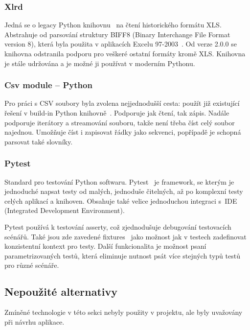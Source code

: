 \subsubsection{Xlrd}
\label{xlrd}

Jedná se o legacy Python knihovnu~\cite{xlrdDocs} na čtení historického formátu XLS. Abstrahuje od parsování struktury BIFF8 (Binary Interchange File Format version 8), která byla použita v aplikacích Excelu 97-2003~\cite{xlsFormat}. Od verze 2.0.0 se knihovna odstranila podporu pro veškeré ostatní formáty kromě XLS. Knihovna je stále udržována a je možné ji používat v moderním Pythonu.~\cite{xlrdChanges} 

\subsubsection{Csv module – Python}

Pro práci s CSV soubory byla zvolena nejjednodušší cesta: použít již existující řešení v build-in Python knihovně~\cite{CsvDocs}. Podporuje jak čtení, tak zápis. Nadále podporuje iterátory a streamování souboru, takže není třeba číst celý soubor najednou. Umožňuje číst i zapisovat řádky jako sekvenci, popřípadě je schopná parsovat také slovníky.

\subsubsection{Pytest}
\label{Pytest}

Standard pro testování Python softwaru. Pytest~\cite{Pytest} je framework, se kterým je jednoduché napsat testy od malých, jednoduše čitelných, až po komplexní testy celých aplikací a knihoven. Obsahuje také velice jednoduchou integraci s~IDE (Integrated Development Environment).

Pytest používá k testování asserty, což zjednodušuje debugování testovacích scénářů. Také jsou zde zavedené fixtures~\cite{PytestFixtures} jako možnost jak v testech zadefinovat konzistentní kontext pro testy. Další funkcionalita je možnost psaní parametrizovaných testů, která eliminuje nutnost psát více stejných typů testů pro různé scénáře.

\subsection{Nepoužité alternativy}

Zmíněné technologie v této sekci nebyly použity v projektu, ale byly uvažovány při návrhu aplikace.


